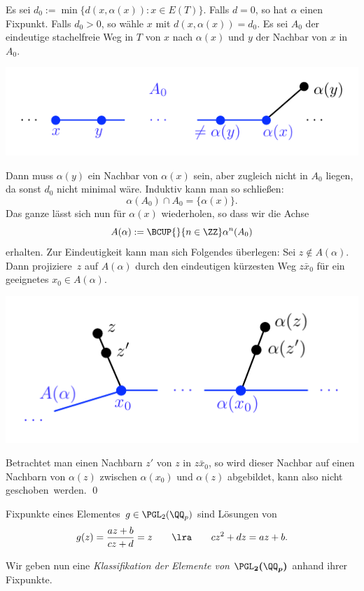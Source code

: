 \bew Es sei $d_0:=\min\{d(x,\alpha(x)):x\in E(T)\}$. Falls $d=0$,
so hat $\alpha$ einen Fixpunkt. Falls $d_0>0$, so wähle $x$ mit
$d(x,\alpha(x))=d_0$. Es sei $A_0$ der eindeutige stachelfreie Weg
in $T$ von $x$ nach $\alpha(x)$ und $y$ der Nachbar von $x$ in $A_0$.
\begin{center}
	\includegraphics{grugraImages/A0}
\end{center}
Dann muss $\alpha(y)$ ein Nachbar von $\alpha(x)$ sein, aber
zugleich nicht in $A_0$ liegen, da sonst $d_0$ nicht minimal wäre.
Induktiv kann man so schließen:
\[
\alpha(A_0) \cap A_0 = \{\alpha(x)\}.
\]
Das ganze lässt sich nun für $\alpha(x)$ wiederholen, so dass wir
die Achse
\[
A(\alpha) := \BCUP{}{n\in\ZZ} \alpha^n(A_0)
\]
erhalten. Zur Eindeutigkeit kann man sich Folgendes überlegen:
Sei $z\not\in A(\alpha)$. Dann \glqq projiziere\grqq\ $z$ auf
$A(\alpha)$ durch den eindeutigen kürzesten Weg $\bar{zx_0}$
für ein geeignetes $x_0\in A(\alpha)$.
\begin{center}
	\includegraphics{grugraImages/Aalpha}
\end{center}
Betrachtet man einen Nachbarn $z'$ von $z$ in $\bar{zx_0}$, so
wird dieser Nachbar auf einen Nachbarn von $\alpha(z)$ zwischen
$\alpha(x_0)$ und $\alpha(z)$ abgebildet, kann also nicht
\glqq geschoben\grqq\ werden.
\qed

Fixpunkte eines Elementes $g\in\PGL_2(\QQ_p)$ sind Lösungen
von
\[
g(z)=\frac{az+b}{cz+d}=z \qquad \lra \qquad
cz^2+dz=az+b.
\]

Wir geben nun eine
\emph{Klassifikation der Elemente von $\boldsymbol{\PGL_2(\QQ_p)}$}
anhand ihrer Fixpunkte.

